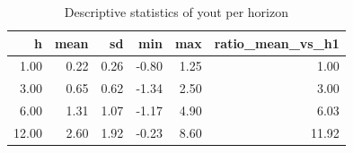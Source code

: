 \begin{table}[ht]
\centering
\begin{tabular}{rrrrrr}
  \hline
h & mean & sd & min & max & ratio\_mean\_vs\_h1 \\ 
  \hline
1.00 & 0.22 & 0.26 & -0.80 & 1.25 & 1.00 \\ 
  3.00 & 0.65 & 0.62 & -1.34 & 2.50 & 3.00 \\ 
  6.00 & 1.31 & 1.07 & -1.17 & 4.90 & 6.03 \\ 
  12.00 & 2.60 & 1.92 & -0.23 & 8.60 & 11.92 \\ 
   \hline
\end{tabular}
\caption{Descriptive statistics of yout per horizon} 
\label{tab:audit_yout_stats}
\end{table}
